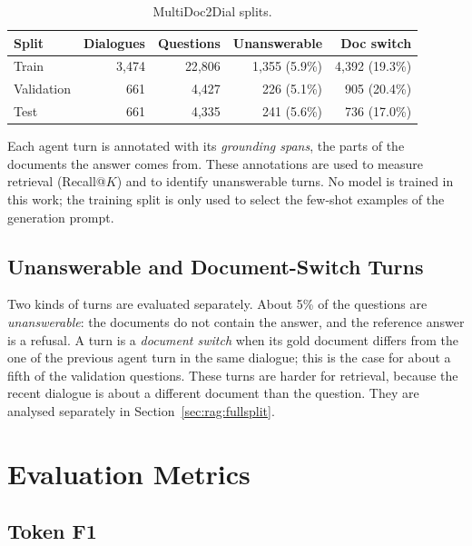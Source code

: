 \begin{table}[ht]
    \centering
    \caption{MultiDoc2Dial splits.}
    \label{tab:dataset:split}
    \begin{tabular}{lrrrr}
        \toprule
        Split & Dialogues & Questions & Unanswerable & Doc switch \\
        \midrule
        Train      & 3{,}474 & 22{,}806 & 1{,}355 (5.9\%) & 4{,}392 (19.3\%) \\
        Validation &   661   &  4{,}427 &   226 (5.1\%)   &   905 (20.4\%) \\
        Test       &   661   &  4{,}335 &   241 (5.6\%)   &   736 (17.0\%) \\
        \bottomrule
    \end{tabular}
\end{table}

Each agent turn is annotated with its \emph{grounding spans}, the parts of the documents
the answer comes from. These annotations are used to measure retrieval (Recall@$K$) and to
identify unanswerable turns. No model is trained in this work; the training split is only
used to select the few-shot examples of the generation prompt.

\subsection{Unanswerable and Document-Switch Turns}

Two kinds of turns are evaluated separately. About 5\% of the questions are
\emph{unanswerable}: the documents do not contain the answer, and the reference answer is
a refusal. A turn is a \emph{document switch} when its gold document differs from the one
of the previous agent turn in the same dialogue; this is the case for about a fifth of
the validation questions. These turns are harder for retrieval, because the recent
dialogue is about a different document than the question. They are analysed separately
in Section~\ref{sec:rag:fullsplit}.


\section{Evaluation Metrics}\label{sec:dataset:metrics}

\subsection{Token F1}

